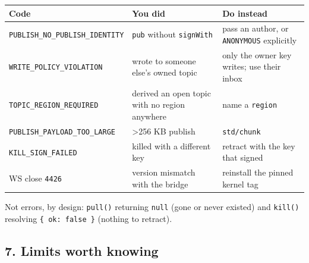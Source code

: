 \documentclass[
  nobib]{tufte-handout}
\newcounter{none} %
\begin{document}
{\def\LTcaptype{none} %
\begin{longtable}[]{@{}
  >{\raggedright\arraybackslash}p{}
  >{\raggedright\arraybackslash}p{}
  >{\raggedright\arraybackslash}p{}@{}}
\toprule\noalign{}
\begin{minipage}[b]{\linewidth}\raggedright
Code
\end{minipage} & \begin{minipage}[b]{\linewidth}\raggedright
You did
\end{minipage} & \begin{minipage}[b]{\linewidth}\raggedright
Do instead
\end{minipage} \\
\midrule\noalign{}
\endhead
\bottomrule\noalign{}
\endlastfoot
\texttt{PUBLISH\_NO\_PUBLISH\_IDENTITY} & \texttt{pub} without
\texttt{signWith} & pass an author, or \texttt{ANONYMOUS} explicitly \\
\texttt{WRITE\_POLICY\_VIOLATION} & wrote to someone else's owned topic
& only the owner key writes; use their inbox \\
\texttt{TOPIC\_REGION\_REQUIRED} & derived an open topic with no region
anywhere & name a \texttt{region} \\
\texttt{PUBLISH\_PAYLOAD\_TOO\_LARGE} & \textgreater256 KB publish &
\texttt{std/chunk} \\
\texttt{KILL\_SIGN\_FAILED} & killed with a different key & retract with
the key that signed \\
WS close \texttt{4426} & version mismatch with the bridge & reinstall
the pinned kernel tag \\
\end{longtable}
}

Not errors, by design: \texttt{pull()} returning \texttt{null} (gone or
never existed) and \texttt{kill()} resolving \texttt{\{\ ok:\ false\ \}}
(nothing to retract).

\subsection{7. Limits worth knowing}\label{limits-worth-knowing}
\end{document}
